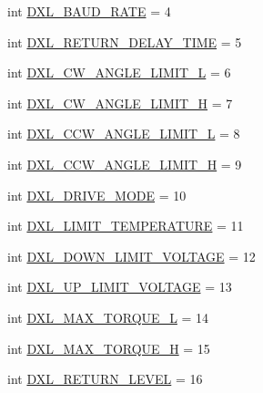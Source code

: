 \begin{DoxyCompactItemize}
\item 
int \hyperlink{namespacedynamixel__driver_1_1dynamixel__const_a622fa575e2b15ca793e5bab57ae94e16}{D\+X\+L\+\_\+\+B\+A\+U\+D\+\_\+\+R\+A\+TE} = 4
\item 
int \hyperlink{namespacedynamixel__driver_1_1dynamixel__const_ada133d0d952c7c0d9a6abd43cf60c853}{D\+X\+L\+\_\+\+R\+E\+T\+U\+R\+N\+\_\+\+D\+E\+L\+A\+Y\+\_\+\+T\+I\+ME} = 5
\item 
int \hyperlink{namespacedynamixel__driver_1_1dynamixel__const_a0895d6bab5eb9e33f4ad1979ff5c5e81}{D\+X\+L\+\_\+\+C\+W\+\_\+\+A\+N\+G\+L\+E\+\_\+\+L\+I\+M\+I\+T\+\_\+L} = 6
\item 
int \hyperlink{namespacedynamixel__driver_1_1dynamixel__const_a013470f90847067eb4d52e33aa50b62c}{D\+X\+L\+\_\+\+C\+W\+\_\+\+A\+N\+G\+L\+E\+\_\+\+L\+I\+M\+I\+T\+\_\+H} = 7
\item 
int \hyperlink{namespacedynamixel__driver_1_1dynamixel__const_ac315ee6e286401dfe148b0690d382f25}{D\+X\+L\+\_\+\+C\+C\+W\+\_\+\+A\+N\+G\+L\+E\+\_\+\+L\+I\+M\+I\+T\+\_\+L} = 8
\item 
int \hyperlink{namespacedynamixel__driver_1_1dynamixel__const_ae0db6a9a6e2a66259a6bfa19b8a7ed9b}{D\+X\+L\+\_\+\+C\+C\+W\+\_\+\+A\+N\+G\+L\+E\+\_\+\+L\+I\+M\+I\+T\+\_\+H} = 9
\item 
int \hyperlink{namespacedynamixel__driver_1_1dynamixel__const_a7118f0c0efb1dc4b8a9f692b2ba50778}{D\+X\+L\+\_\+\+D\+R\+I\+V\+E\+\_\+\+M\+O\+DE} = 10
\item 
int \hyperlink{namespacedynamixel__driver_1_1dynamixel__const_a903455bd80c1142ccbf36547bbfac7ad}{D\+X\+L\+\_\+\+L\+I\+M\+I\+T\+\_\+\+T\+E\+M\+P\+E\+R\+A\+T\+U\+RE} = 11
\item 
int \hyperlink{namespacedynamixel__driver_1_1dynamixel__const_a041e26d7bd2069105e42d67f6eac3929}{D\+X\+L\+\_\+\+D\+O\+W\+N\+\_\+\+L\+I\+M\+I\+T\+\_\+\+V\+O\+L\+T\+A\+GE} = 12
\item 
int \hyperlink{namespacedynamixel__driver_1_1dynamixel__const_aeb07f160ea174a11370b256921529d60}{D\+X\+L\+\_\+\+U\+P\+\_\+\+L\+I\+M\+I\+T\+\_\+\+V\+O\+L\+T\+A\+GE} = 13
\item 
int \hyperlink{namespacedynamixel__driver_1_1dynamixel__const_a95c4447999c2027eb0aab8bc89d8cb08}{D\+X\+L\+\_\+\+M\+A\+X\+\_\+\+T\+O\+R\+Q\+U\+E\+\_\+L} = 14
\item 
int \hyperlink{namespacedynamixel__driver_1_1dynamixel__const_ac7179025db3a711b6a970d3d48f0e866}{D\+X\+L\+\_\+\+M\+A\+X\+\_\+\+T\+O\+R\+Q\+U\+E\+\_\+H} = 15
\item 
int \hyperlink{namespacedynamixel__driver_1_1dynamixel__const_acaa154404ef7dd599081f953b9f4e558}{D\+X\+L\+\_\+\+R\+E\+T\+U\+R\+N\+\_\+\+L\+E\+V\+EL} = 16

\end{DoxyCompactItemize}
